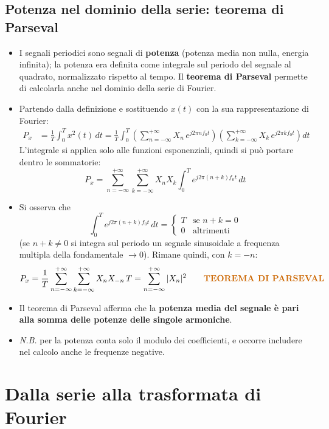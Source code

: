 \documentclass[12pt, a4paper]{article}
\begin{document}
\subsection{Potenza nel dominio della serie: teorema di Parseval}
\begin{itemize}
    \item I segnali periodici sono segnali di \textbf{potenza} (potenza media non nulla, energia infinita); la potenza era definita come integrale sul periodo del segnale al quadrato, normalizzato rispetto al tempo. Il \textbf{teorema di Parseval} permette di calcolarla anche nel dominio della serie di Fourier.
    \item Partendo dalla definizione e sostituendo $x(t)$ con la sua rappresentazione di Fourier:
    \begin{align*}
        P_x &= \frac{1}{T}\int_0^{T} x^2(t)\,dt = \frac{1}{T}\int_0^{T}\left(\sum_{n=-\infty}^{+\infty} X_n\,e^{j2\pi nf_0t}\right)\left(\sum_{k=-\infty}^{+\infty} X_k\,e^{j2\pi kf_0t}\right) dt
    \end{align*}
    L'integrale si applica solo alle funzioni esponenziali, quindi si può portare dentro le sommatorie:
    $$P_x = \sum_{n=-\infty}^{+\infty}\sum_{k=-\infty}^{+\infty} X_nX_k \int_0^{T} e^{j2\pi(n+k)f_0t}\,dt$$
    \item Si osserva che
    $$\int_0^{T} e^{j2\pi(n+k)f_0t}\,dt = \begin{cases} T & \text{se } n+k=0 \\ 0 & \text{altrimenti}\end{cases}$$
    (se $n+k\ne0$ si integra sul periodo un segnale sinusoidale a frequenza multipla della fondamentale $\to 0$). Rimane quindi, con $k=-n$:
    $$P_x = \frac{1}{T}\sum_{n=-\infty}^{+\infty}\sum_{k=-\infty}^{+\infty} X_nX_{-n}\,T = \sum_{n=-\infty}^{+\infty} |X_n|^2 \qquad \textbf{\textcolor{orange!80!black}{TEOREMA DI PARSEVAL}}$$
    \item Il teorema di Parseval afferma che la \textbf{potenza media del segnale è pari alla somma delle potenze delle singole armoniche}.
    \item[] \textit{N.B.} per la potenza conta solo il modulo dei coefficienti, e occorre includere nel calcolo anche le frequenze negative.
\end{itemize}

\section{Dalla serie alla trasformata di Fourier}
\end{document}
